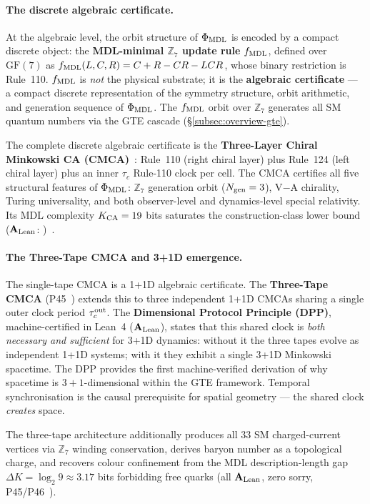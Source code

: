 \paragraph{The discrete algebraic certificate.}
At the algebraic level, the orbit structure of $\Phi_{\rm MDL}$ is encoded by a
compact discrete object: the \textbf{MDL-minimal $\mathbb{Z}_7$ update rule}
$f_{\rm MDL}$, defined over $\mathrm{GF}(7)$ as
$f_{\rm MDL}(L,C,R) = C + R - CR - LCR$, whose binary restriction is Rule~110.
$f_{\rm MDL}$ is \emph{not} the physical substrate; it is the
\textbf{algebraic certificate} --- a compact discrete representation of the
symmetry structure, orbit arithmetic, and generation sequence of $\Phi_{\rm MDL}$.
The $f_{\rm MDL}$ orbit over $\mathbb{Z}_7$ generates all SM quantum numbers via the
GTE cascade (\S\ref{subsec:overview-gte}).

The complete discrete algebraic certificate is the \textbf{Three-Layer Chiral
Minkowski CA (CMCA)}~\cite{SpivackCMCA}: Rule~110 (right chiral layer) plus
Rule~124 (left chiral layer) plus an inner $\tau_c$ Rule-110 clock per cell.
The CMCA certifies all five structural features of $\Phi_{\rm MDL}$: $\mathbb{Z}_7$
generation orbit ($N_{\rm gen}=3$), V$-$A chirality, Turing universality, and both
observer-level and dynamics-level special relativity.  Its MDL complexity
$K_{\rm CA} = 19$ bits saturates the construction-class lower bound
($\mathbf{A}_{\rm Lean}$: )~\cite{SpivackCMCA}.

\paragraph{The Three-Tape CMCA and 3+1D emergence.}
The single-tape CMCA is a 1+1D algebraic certificate.  The \textbf{Three-Tape CMCA}
(P45~\cite{SpivackThreeTapeCMCA}) extends this to three independent 1+1D CMCAs
sharing a single outer clock period $\tau_c^{\rm out}$.  The
\textbf{Dimensional Protocol Principle (DPP)}, machine-certified in Lean~4
($\mathbf{A}_{\rm Lean}$), states that this shared clock is \emph{both necessary
and sufficient} for 3+1D dynamics: without it the three tapes evolve as independent
1+1D systems; with it they exhibit a single 3+1D Minkowski spacetime.  The DPP
provides the first machine-verified derivation of why spacetime is $3+1$-dimensional
within the GTE framework.  Temporal synchronisation is the causal prerequisite for
spatial geometry --- the shared clock \emph{creates} space.

The three-tape architecture additionally produces all 33 SM charged-current vertices
via $\mathbb{Z}_7$ winding conservation, derives baryon number as a topological
charge, and recovers colour confinement from the MDL description-length gap
$\Delta K = \log_2 9 \approx 3.17$ bits forbidding free quarks (all $\mathbf{A}_{\rm Lean}$,
zero sorry, P45/P46~\cite{SpivackGTEPolynomialUFT}).

